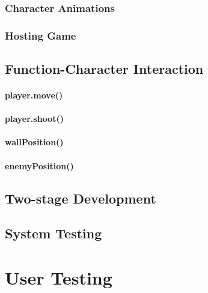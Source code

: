 \documentclass[a4paper,11.5pt]{report}
\numberwithin{figure}{section}
\numberwithin{table}{section}
\numberwithin{equation}{section}
\numberwithin{equation}{section}
\newcommand\blankpage{%
    \null
    \thispagestyle{empty}%
    \addtocounter{page}{-1}%
    \newpage}
\begin{document}
\subsection{Character Animations}



\subsection{Hosting Game}


\section{Function-Character Interaction}

\subsubsection*{player.move()}

\subsubsection*{player.shoot()}

\subsubsection*{wallPosition()}

\subsubsection*{enemyPosition()}



\section{Two-stage Development}

\section{System Testing}


\afterpage{\blankpage}




\chapter{User Testing}
\end{document}
